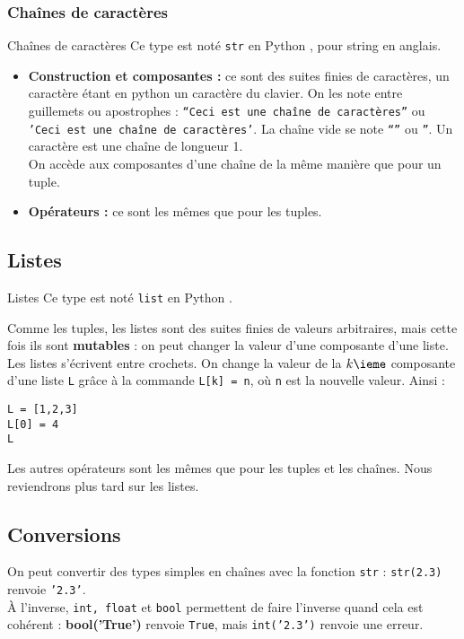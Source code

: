\subsubsection{Chaînes de caractères}
\begin{defi}{Chaînes de caractères}
Ce type est noté \texttt{str} en Python , pour {string} en anglais.
\begin{itemize}
\item \textbf{Construction et composantes :} ce sont des suites finies de caractères, un caractère étant en python un caractère du clavier. On 
les note entre guillemets ou apostrophes : \texttt{``Ceci est une chaîne de caractères''} ou  
\texttt{'Ceci est une chaîne de caractères'}. La chaîne vide se note \texttt{``}\texttt{''} ou 
\texttt{''}. Un caractère est une chaîne de longueur 1.\\
On accède aux composantes d'une chaîne de la même manière que pour un tuple.
\item \textbf{Opérateurs :} ce sont les mêmes que pour les tuples.
\end{itemize}
\end{defi}
\subsection{Listes}
\begin{defi}{Listes}
Ce type est noté \texttt{list} en Python .

Comme les tuples, les {listes} sont des suites finies de valeurs arbitraires, mais cette fois 
ils sont \textbf{mutables} : on peut changer la valeur d'une composante d'une liste.\\
Les listes s'écrivent entre crochets. On change la valeur de la $k\ieme$ composante d'une liste 
\texttt{L} grâce à la commande \texttt{L[k] = n}, où \texttt{n} est la nouvelle valeur. Ainsi :
\begin{lstlisting}
L = [1,2,3] 
L[0] = 4  
L 
\end{lstlisting}

Les autres opérateurs sont les mêmes que pour les tuples et les chaînes. Nous reviendrons plus tard sur les listes.
\end{defi}

\subsection{Conversions}

On peut convertir des types simples en chaînes avec la fonction \texttt{str} : \texttt{str(2.3)} 
renvoie \texttt{'2.3'}.\\
À l'inverse, \texttt{int, float} et \texttt{bool} permettent de faire l'inverse quand cela est 
cohérent : \textbf{bool('True')} renvoie \texttt{True}, mais \texttt{int('2.3')} renvoie une 
erreur.\\

